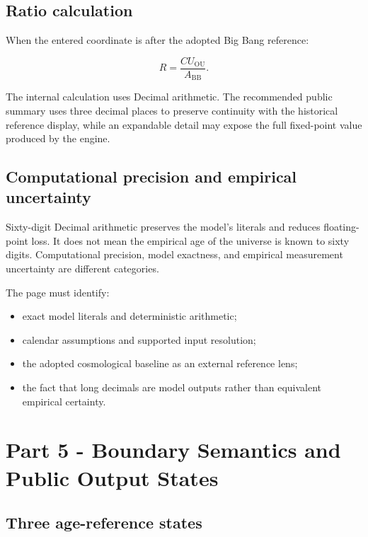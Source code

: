 \documentclass[11pt,letterpaper]{article}
\begin{document}
\subsection{Ratio calculation}

When the entered coordinate is after the adopted Big Bang reference:

\[
R = \frac{CU_{\mathrm{OU}}}{A_{\mathrm{BB}}}.
\]

The internal calculation uses Decimal arithmetic. The recommended public
summary uses three decimal places to preserve continuity with the historical
reference display, while an expandable detail may expose the full fixed-point
value produced by the engine.

\subsection{Computational precision and empirical uncertainty}

\begin{safetybox}
Sixty-digit Decimal arithmetic preserves the model's literals and reduces
floating-point loss. It does not mean the empirical age of the universe is
known to sixty digits. Computational precision, model exactness, and empirical
measurement uncertainty are different categories.
\end{safetybox}

The page must identify:

\begin{itemize}
    \item exact model literals and deterministic arithmetic;
    \item calendar assumptions and supported input resolution;
    \item the adopted cosmological baseline as an external reference lens;
    \item the fact that long decimals are model outputs rather than equivalent
          empirical certainty.
\end{itemize}

\section{Part 5 - Boundary Semantics and Public Output States}

\subsection{Three age-reference states}
\end{document}
